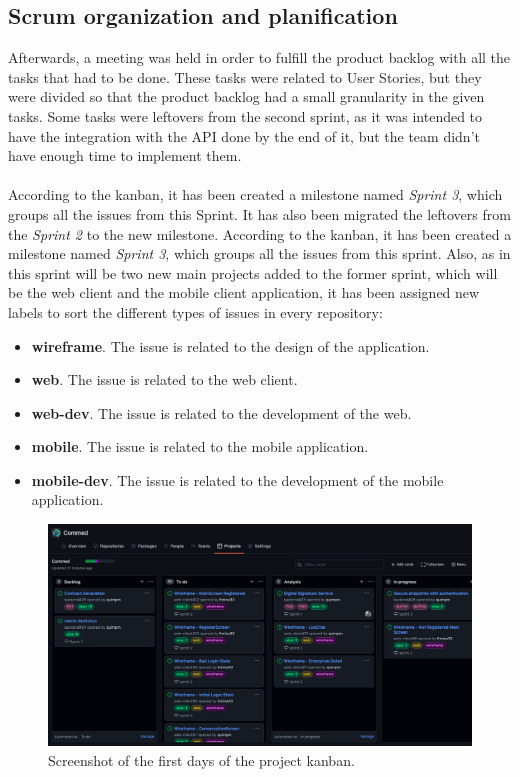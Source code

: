 \documentclass[./main.tex]{subfiles}
\begin{document}
\subsection{Scrum organization and planification}
Afterwards, a meeting was held in order to fulfill the product backlog
with all the tasks that had to be done. These tasks were related to User
Stories, but they were divided so that the product backlog had a small
granularity in the given tasks. Some tasks were leftovers from the second sprint, as 
it was intended to have the integration with the API done by the end of it, but 
the team didn't have enough time to implement them.
\\
\\
According to the kanban, it has been created a milestone named \textit{Sprint  3}, which groups all the issues from this Sprint. It has also been migrated the leftovers from the \textit{Sprint 2} to the new milestone.
According to the kanban, it has been created a milestone named \textit{Sprint 3}, which groups all the issues from this sprint. Also, as in this sprint will be two new main projects added to the former sprint, which will be the web client and the mobile client application, it has been assigned new labels to sort the different types of issues in every repository:
\begin{itemize}
	\item \textbf{wireframe}. The issue is related to the design of the application.
	\item \textbf{web}. The issue is related to the web client.
	\item \textbf{web-dev}. The issue is related to the development of the web.
	\item \textbf{mobile}. The issue is related to the mobile application.
	\item \textbf{mobile-dev}. The issue is related to the development of the mobile application.
\end{itemize}
\begin{figure}[H]
	\includegraphics[width=15cm]{img/kanban.png}
	\caption{Screenshot of the first days of the project kanban.}
\end{figure}
\end{document}
